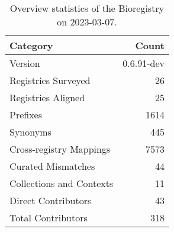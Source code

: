 \begin{table}
\centering
\caption{Overview statistics of the Bioregistry on 2023-03-07.}
\label{tab:bioregistry-summary}
\begin{tabular}{lr}
\toprule
                Category &      Count \\
\midrule
                 Version & 0.6.91-dev \\
     Registries Surveyed &         26 \\
      Registries Aligned &         25 \\
                Prefixes &       1614 \\
                Synonyms &        445 \\
 Cross-registry Mappings &       7573 \\
      Curated Mismatches &         44 \\
Collections and Contexts &         11 \\
     Direct Contributors &         43 \\
      Total Contributors &        318 \\
\bottomrule
\end{tabular}
\end{table}
